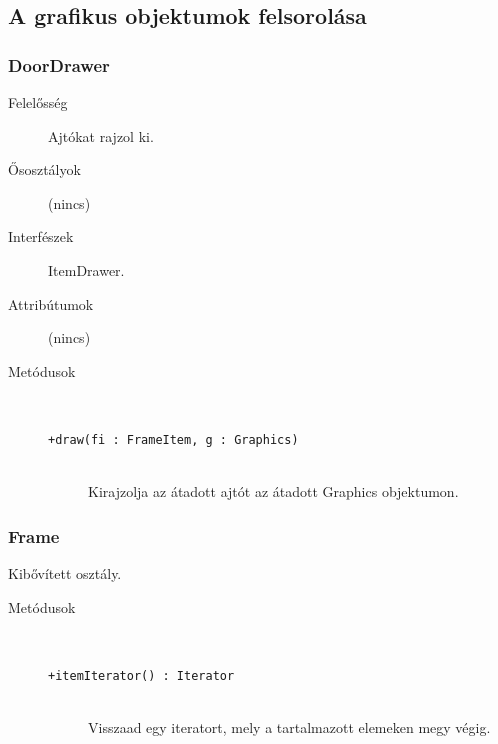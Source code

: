 	\clearpage
	\subsection{A grafikus objektumok felsorolása}
	
		\subsubsection{DoorDrawer}
			\begin{description}

				\item[Felelősség] Ajtókat rajzol ki.

				\item[Ősosztályok] (nincs)
				\item[Interfészek] ItemDrawer.
				\item[Attribútumok] (nincs)
				\item[Metódusok]$\ $
					\begin{description}
						\item[\texttt{+draw(fi : FrameItem, g : Graphics)}] \hfill \\Kirajzolja az átadott ajtót az átadott Graphics objektumon. 
					\end{description}
			\end{description}

		\subsubsection{Frame}
			Kibővített osztály.
			\begin{description}
				\item[Metódusok]$\ $
					\begin{description}
						\item[\texttt{+itemIterator() : Iterator}] \hfill \\Visszaad egy iteratort, mely a tartalmazott  elemeken megy végig. 
					\end{description}
			\end{description}
			
